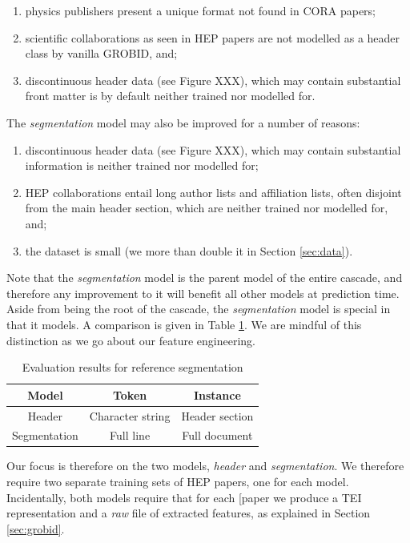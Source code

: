 \begin{enumerate}
\item physics publishers present a unique format not found in CORA papers;
\item scientific collaborations as seen in HEP papers are not modelled as a header class by vanilla GROBID, and;
\item discontinuous header data (see Figure XXX), which may contain substantial front matter is by default neither trained nor modelled for.
\end{enumerate}

The \emph{segmentation} model may also be improved for a number of reasons:

\begin{enumerate}
\item discontinuous header data (see Figure XXX), which may contain substantial information is neither trained nor modelled for;
\item HEP collaborations entail long author lists and affiliation lists, often disjoint from the main header section, which are neither trained nor modelled for, and;
\item the dataset is small (we more than double it in Section \ref{sec:data}).
\end{enumerate}

Note that the \emph{segmentation} model is the parent model of the entire cascade, and therefore any improvement to it will benefit all other models at prediction time. Aside from being the root of the cascade, the \emph{segmentation} model is special in that it models. A comparison is given in Table \ref{table:headervssegmentation}. We are mindful of this distinction as we go about our feature engineering.

\begin{table}[h]
\begin{center}
\begin{tabular}{|c|c|c|}
\hline
Model & Token & Instance \\
\hline
Header & Character string & Header section \\
\hline
Segmentation & Full line & Full document \\
\hline
\end{tabular}
\caption[Comparison of token and instance ]{Evaluation results for reference segmentation}
\label{table:headervssegmentation}
\end{center}
\end{table}

Our focus is therefore on the two models, \emph{header} and \emph{segmentation}. We therefore require two separate training sets of HEP papers, one for each model. Incidentally, both models require that for each [paper we produce a TEI representation and a \emph{raw} file of extracted features, as explained in Section \ref{sec:grobid}.


